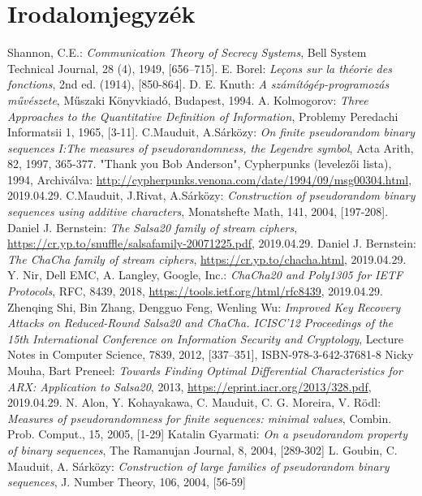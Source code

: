 \documentclass[hidelinks, 12pt]{article}
\begin{document}
\section{Irodalomjegyzék}
	\renewcommand\refname{}
\begin{thebibliography}{3}
	Shannon, C.E.: \textit{Communication Theory of Secrecy Systems}, Bell System Technical Journal, 28 (4), 1949, [656–715].
	E. Borel: \textit{Leçons sur la théorie des fonctions}, 2nd ed. (1914), [850-864].
	D. E. Knuth: \textit{A számítógép-programozás művészete}, Műszaki Könyvkiadó, Budapest, 1994.
	A. Kolmogorov: \textit{Three Approaches to the Quantitative Definition of Information}, Problemy Peredachi Informatsii 1, 1965, [3-11].
	C.Mauduit, A.Sárközy: \textit{On finite pseudorandom binary sequences I:The measures of pseudorandomness, the Legendre symbol}, Acta Arith, 82, 1997, 365-377.
	"Thank you Bob Anderson", Cypherpunks (levelezői lista), 1994, Archiválva: \url{http://cypherpunks.venona.com/date/1994/09/msg00304.html}, 2019.04.29.
	C.Mauduit, J.Rivat, A.Sárközy: \textit{Construction of pseudorandom binary sequences using additive characters}, Monatshefte Math, 141, 2004, [197-208].
	Daniel J. Bernstein: \textit{The Salsa20 family of stream ciphers}, \url{https://cr.yp.to/snuffle/salsafamily-20071225.pdf}, 2019.04.29.
	Daniel J. Bernstein: \textit{The ChaCha family of stream ciphers}, \url{https://cr.yp.to/chacha.html}, 2019.04.29.
	Y. Nir, Dell EMC, A. Langley, Google, Inc.: \textit{ChaCha20 and Poly1305 for IETF Protocols}, RFC, 8439, 2018, \url{https://tools.ietf.org/html/rfc8439}, 2019.04.29.
	Zhenqing Shi, Bin Zhang, Dengguo Feng, Wenling Wu: \textit{Improved Key Recovery Attacks on Reduced-Round Salsa20 and ChaCha. ICISC'12 Proceedings of the 15th International Conference on Information Security and Cryptology}, Lecture Notes in Computer Science, 7839, 2012, [337–351], ISBN-978-3-642-37681-8
	Nicky Mouha, Bart Preneel: \textit{Towards Finding Optimal Differential Characteristics for ARX: Application to Salsa20}, 2013,  \url{https://eprint.iacr.org/2013/328.pdf}, 2019.04.29.
	N. Alon, Y. Kohayakawa, C. Mauduit, C. G. Moreira, V. Rödl: \textit{Measures of pseudorandomness for finite sequences: minimal values}, Combin. Prob. Comput., 15, 2005, [1-29]
	Katalin Gyarmati: \textit{On a pseudorandom property of binary sequences}, The Ramanujan Journal, 8, 2004, [289-302]
	L. Goubin, C. Mauduit, A. Sárközy: \textit{Construction of large families of pseudorandom binary sequences}, J. Number Theory, 106, 2004, [56-59]
\end{thebibliography}
\end{document}

